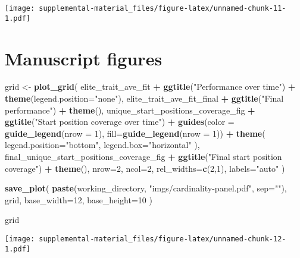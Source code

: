\documentclass[]{book}
\newenvironment{Shaded}{\begin{snugshade}}{\end{snugshade}}
\newcommand{\DataTypeTok}[1]{\textcolor[rgb]{0.13,0.29,0.53}{#1}}
\newcommand{\DecValTok}[1]{\textcolor[rgb]{0.00,0.00,0.81}{#1}}
\newcommand{\KeywordTok}[1]{\textcolor[rgb]{0.13,0.29,0.53}{\textbf{#1}}}
\newcommand{\NormalTok}[1]{#1}
\newcommand{\OperatorTok}[1]{\textcolor[rgb]{0.81,0.36,0.00}{\textbf{#1}}}
\newcommand{\StringTok}[1]{\textcolor[rgb]{0.31,0.60,0.02}{#1}}
\begin{document}
\texttt{[image: supplemental-material\_files/figure-latex/unnamed-chunk-11-1.pdf]}

\hypertarget{manuscript-figures}{%
\section{Manuscript figures}\label{manuscript-figures}}

\begin{Shaded}
\begin{Highlighting}[]
\NormalTok{grid <-}\StringTok{ }\KeywordTok{plot_grid}\NormalTok{(}
\NormalTok{  elite_trait_ave_fit }\OperatorTok{+}
\StringTok{    }\KeywordTok{ggtitle}\NormalTok{(}\StringTok{"Performance over time"}\NormalTok{) }\OperatorTok{+}
\StringTok{    }\KeywordTok{theme}\NormalTok{(}\DataTypeTok{legend.position=}\StringTok{"none"}\NormalTok{),}
\NormalTok{  elite_trait_ave_fit_final }\OperatorTok{+}
\StringTok{    }\KeywordTok{ggtitle}\NormalTok{(}\StringTok{"Final performance"}\NormalTok{) }\OperatorTok{+}
\StringTok{    }\KeywordTok{theme}\NormalTok{(),}
\NormalTok{  unique_start_positions_coverage_fig }\OperatorTok{+}
\StringTok{    }\KeywordTok{ggtitle}\NormalTok{(}\StringTok{"Start position coverage over time"}\NormalTok{) }\OperatorTok{+}
\StringTok{    }\KeywordTok{guides}\NormalTok{(}\DataTypeTok{color =} \KeywordTok{guide_legend}\NormalTok{(}\DataTypeTok{nrow =} \DecValTok{1}\NormalTok{), }\DataTypeTok{fill=}\KeywordTok{guide_legend}\NormalTok{(}\DataTypeTok{nrow =} \DecValTok{1}\NormalTok{)) }\OperatorTok{+}
\StringTok{    }\KeywordTok{theme}\NormalTok{(}
      \DataTypeTok{legend.position=}\StringTok{"bottom"}\NormalTok{,}
      \DataTypeTok{legend.box=}\StringTok{"horizontal"}
\NormalTok{    ),}
\NormalTok{  final_unique_start_positions_coverage_fig }\OperatorTok{+}
\StringTok{    }\KeywordTok{ggtitle}\NormalTok{(}\StringTok{"Final start position coverage"}\NormalTok{) }\OperatorTok{+}
\StringTok{    }\KeywordTok{theme}\NormalTok{(),}
  \DataTypeTok{nrow=}\DecValTok{2}\NormalTok{,}
  \DataTypeTok{ncol=}\DecValTok{2}\NormalTok{,}
  \DataTypeTok{rel_widths=}\KeywordTok{c}\NormalTok{(}\DecValTok{2}\NormalTok{,}\DecValTok{1}\NormalTok{),}
  \DataTypeTok{labels=}\StringTok{"auto"}
\NormalTok{)}

\KeywordTok{save_plot}\NormalTok{(}
  \KeywordTok{paste}\NormalTok{(working_directory, }\StringTok{"imgs/cardinality-panel.pdf"}\NormalTok{, }\DataTypeTok{sep=}\StringTok{""}\NormalTok{),}
\NormalTok{  grid,}
  \DataTypeTok{base_width=}\DecValTok{12}\NormalTok{,}
  \DataTypeTok{base_height=}\DecValTok{10}
\NormalTok{)}

\NormalTok{grid}
\end{Highlighting}
\end{Shaded}

\texttt{[image: supplemental-material\_files/figure-latex/unnamed-chunk-12-1.pdf]}


\end{document}
